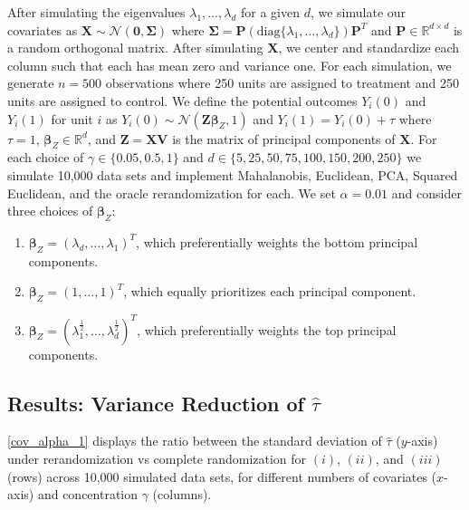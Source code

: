 \documentclass[11pt,twoside]{article}
\theoremstyle{definition}
\theoremstyle{remark}
\begin{document}
After simulating the eigenvalues $\lambda_1, \ldots, \lambda_d$ for a given $d$, we simulate our covariates as $\mathbf{X} \sim \mathcal{N}(\mathbf{0}, \mathbf{\Sigma})$ where $\mathbf{\Sigma} = \mathbf{P}( \text{diag}\{\lambda_1, \ldots, \lambda_d\}) \mathbf{P}^T$ and $\mathbf{P} \in \mathbb{R}^{d \times d}$ is a random orthogonal matrix. After simulating $\mathbf{X}$, we center and standardize each column such that each has mean zero and variance one. For each simulation, we generate $n = 500$ observations where 250 units are assigned to treatment and 250 units are assigned to control. We define the potential outcomes $Y_i(0)$ and $Y_i(1)$ for unit $i$ as $Y_i(0) \sim \mathcal{N}(\mathbf{Z}\bm{\beta}_Z, 1)$ and $Y_i(1) = Y_i(0) + \tau$ where $\tau = 1$, $\bm{\beta}_Z \in \mathbb{R}^d$, and $\mathbf{Z} = \mathbf{X} \mathbf{V}$ is the matrix of principal components of $\mathbf{X}$. For each choice of $\gamma \in \{0.05, 0.5, 1\}$ and $d \in \{5, 25, 50, 75, 100, 150, 200, 250\}$ we simulate 10,000 data sets and implement Mahalanobis, Euclidean, PCA, Squared Euclidean, and the oracle rerandomization for each. We set $\alpha = 0.01$ and  consider three choices of $\bm{\beta}_Z$:
\begin{enumerate}
    \item[(i)] $\bm{\beta}_Z = (\lambda_d, \ldots, \lambda_1 )^T$, which preferentially weights the bottom principal components.
    \item[(ii)] $\bm{\beta}_Z = (1, \ldots, 1)^T$, which equally prioritizes each principal component.
    \item[(iii)] $\bm{\beta}_Z = (\lambda^{\frac{1}{2}}_1, \ldots, \lambda^{\frac{1}{2}}_d)^T$, which preferentially weights the top principal components.
\end{enumerate}


\subsection{Results: Variance Reduction of $\widehat{\tau}$} \label{variance_reduction_sim_section}
\cref{cov_alpha_1} displays the ratio between the standard deviation of $\widehat{\tau}$ ($y$-axis) under rerandomization vs complete randomization for $(i)$, $(ii)$, and $(iii)$ (rows) across 10,000 simulated data sets, for different numbers of covariates ($x$-axis) and concentration $\gamma$ (columns). 
\end{document}
